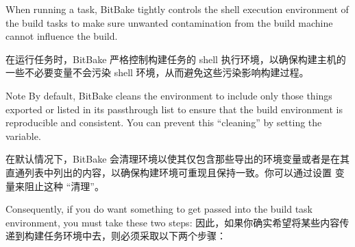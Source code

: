 When running a task, BitBake tightly controls the shell execution environment of the build tasks to make sure unwanted contamination from the build machine cannot influence the build.

在运行任务时，BitBake 严格控制构建任务的 shell 执行环境，以确保构建主机的一些不必要变量不会污染 shell 环境，从而避免这些污染影响构建过程。

\begin{noteblock}{Note}%
By default, BitBake cleans the environment to include only those things exported or listed in its passthrough list to ensure that the build environment is reproducible and consistent. You can prevent this ``cleaning'' by setting the  variable.

\medskip
在默认情况下，BitBake 会清理环境以使其仅包含那些导出的环境变量或者是在其直通列表中列出的内容，以确保构建环境可重现且保持一致。你可以通过设置  变量来阻止这种 ``清理''。
\end{noteblock}

Consequently, if you do want something to get passed into the build task environment, you must take these two steps:
因此，如果你确实希望将某些内容传递到构建任务环境中去，则必须采取以下两个步骤：

